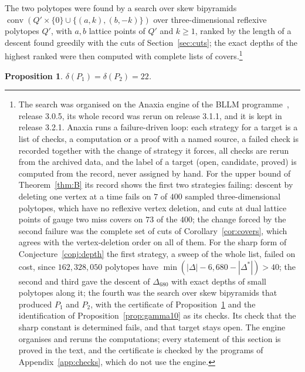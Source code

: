 \documentclass[manuscript]{aomart}
\newtheorem{proposition}[theorem]{Proposition}
\theoremstyle{definition}
\theoremstyle{remark}
\newcommand{\conv}{\operatorname{conv}}
\newcommand{\Dbig}{\Delta_{680}}
\begin{document}
The two polytopes were found by a search over skew bipyramids
$\conv(Q'\times\{0\}\cup\{(a,k),(b,-k)\})$ over three-dimensional
reflexive polytopes $Q'$, with $a,b$ lattice points of $Q'$ and $k\ge1$,
ranked by the length of a descent found greedily with the cuts of
Section~\ref{sec:cuts}; the exact depths of the highest ranked were then
computed with complete lists of covers.\footnote{The search was organised
on the Anaxia engine of the BLLM programme~\cite{Ana26,BB26}, release
3.0.5, its whole record was rerun on release 3.1.1, and it is kept in release 3.2.1. Anaxia runs a failure-driven loop: each strategy for a target is a
list of checks, a computation or a proof with a named source, a failed
check is recorded together with the change of strategy it forces, all
checks are rerun from the archived data, and the label of a target (open,
candidate, proved) is computed from the record, never assigned by hand.
For the upper bound of Theorem~\ref{thm:B} its record shows the first two
strategies failing: descent by deleting one vertex at a time fails on $7$
of $400$ sampled three-dimensional polytopes, which have no reflexive
vertex deletion, and cuts at dual lattice points of gauge two miss covers
on $73$ of the $400$; the change forced by the second failure was the
complete set of cuts of Corollary~\ref{cor:covers}, which agrees with the
vertex-deletion order on all of them. For the sharp form of
Conjecture~\ref{conj:depth} the first strategy, a sweep of the whole list,
failed on cost, since $162{,}328{,}050$ polytopes have
$\min(|\Delta|-6,680-|\Delta^*|)>40$; the second and third gave the descent
of $\Dbig$ with exact depths of small polytopes along it; the fourth was
the search over skew bipyramids that produced $P_1$ and $P_2$, with the
certificate of Proposition~\ref{prop:depth22} and the identification of
Proposition~\ref{prop:gamma10} as its checks. Its check that the sharp
constant is determined fails, and that target stays open. The engine
organises and reruns the computations; every statement of this section is
proved in the text, and the certificate is checked by the programs of
Appendix~\ref{app:checks}, which do not use the engine.}

\begin{proposition}\label{prop:depth22}
$\delta(P_1)=\delta(P_2)=22$.
\end{proposition}
\end{document}
